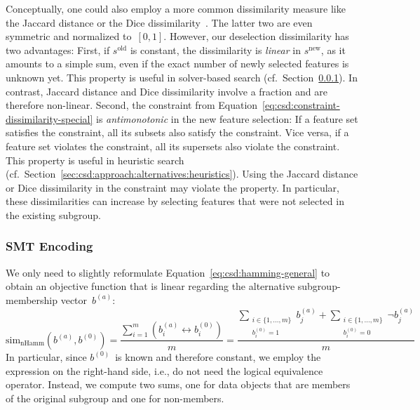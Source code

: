 \documentclass{article}
\theoremstyle{definition}
\begin{document}
Conceptually, one could also employ a more common dissimilarity measure like the Jaccard distance or the Dice dissimilarity~\cite{choi2010survey}.
The latter two are even symmetric and normalized to~$[0,1]$.
However, our deselection dissimilarity has two advantages:
First, if $s^{\text{old}}$ is constant, the dissimilarity is \emph{linear} in $s^{\text{new}}$, as it amounts to a simple sum, even if the exact number of newly selected features is unknown yet.
This property is useful in solver-based search (cf.~Section~\ref{sec:csd:approach:alternatives:smt}).
In contrast, Jaccard distance and Dice dissimilarity involve a fraction and are therefore non-linear.
Second, the constraint from Equation~\ref{eq:csd:constraint-dissimilarity-special} is \emph{antimonotonic} in the new feature selection:
If a feature set satisfies the constraint, all its subsets also satisfy the constraint.
Vice versa, if a feature set violates the constraint, all its supersets also violate the constraint.
This property is useful in heuristic search (cf.~Section~\ref{sec:csd:approach:alternatives:heuristics}).
Using the Jaccard distance or Dice dissimilarity in the constraint may violate the property.
In particular, these dissimilarities can increase by selecting features that were not selected in the existing subgroup.

\subsubsection{SMT Encoding}
\label{sec:csd:approach:alternatives:smt}

We only need to slightly reformulate Equation~\ref{eq:csd:hamming-general} to obtain an objective function that is linear regarding the alternative subgroup-membership vector~$b^{(a)}$:
%
\begin{equation}
	\text{sim}_{\text{nHamm}}(b^{(a)}, b^{(0)}) = \frac{\sum_{i=1}^m \left( b_i^{(a)} \leftrightarrow b_i^{(0)} \right) }{m} = \frac{\sum\limits_{\substack{i \in \{1, \dots, m\} \\ b_i^{(0)} = 1}} b_j^{(a)} + \sum\limits_{\substack{i \in \{1, \dots, m\} \\ b_i^{(0)} = 0}} \lnot b_j^{(a)}}{m}
	\label{eq:csd:hamming-smt}
\end{equation}
%
In particular, since $b^{(0)}$~is known and therefore constant, we employ the expression on the right-hand side, i.e., do not need the logical equivalence operator.
Instead, we compute two sums, one for data objects that are members of the original subgroup and one for non-members.
\end{document}
